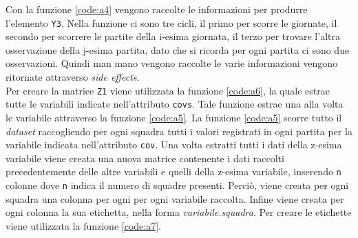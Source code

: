 Con la funzione \ref{code:a4} vengono raccolte le informazioni per produrre l'elemento \texttt{Y3}. Nella funzione ci sono tre cicli, il primo per scorre le giornate, il secondo per scorrere le partite della i-esima giornata, il terzo per trovare l'altra osservazione della j-esima partita, dato che si ricorda per ogni partita ci sono due osservazioni. Quindi man mano vengono raccolte le varie informazioni vengono ritornate attraverso \emph{side effects}.\\
Per creare la matrice \texttt{Z1} viene utilizzata la funzione \ref{code:a6}, la quale estrae tutte le variabili indicate nell'attributo \texttt{covs}. Tale funzione estrae una alla volta le variabile attraverso la funzione \ref{code:a5}. La funzione \ref{code:a5} scorre tutto il \emph{dataset} raccogliendo per ogni squadra tutti i valori registrati in ogni partita per la variabile indicata nell'attributo \texttt{cov}. Una volta estratti tutti i dati della z-esima variabile viene creata una nuova matrice contenente i dati raccolti precedentemente delle altre variabili e quelli della z-esima variabile, inserendo \texttt{n} colonne dove \texttt{n} indica il numero di squadre presenti. Perciò, viene creata per ogni squadra una colonna per ogni per ogni variabile raccolta. Infine viene creata per ogni colonna la sua etichetta, nella forma \emph{variabile.squadra}. Per creare le etichette viene utilizzata la funzione \ref{code:a7}.\\
\begin{comment}
Infine, vengono riportati i comandi per eseguire le modifiche
\begin{lstlisting}[language=R, caption={Comandi per la creazione della lista per il pacchetto \textit{BTLLAsso}}, captionpos=b, label=sec:a9]
	Ztmp <-c()
	row <- rowLabel(str1, 38)
	createYFull(SerieA)
	subject.name <- levels(as.factor(SerieA$Round))
	object.name <- levels(as.factor(SerieA$Team))
	Ztmp<-extractAll(c("Poss","Sh","SoT", "G/Sh", "Saves", "PAtt","PCmp%", "SPAtt",    "SPCmp%",  
	"MPAtt",    "MPCmp%",   "LPAtt",    "LPCmp%", "ToDefPen", "ToDef3rd", "ToMid3rd", "ToAtt3rd", "ToAttPen", "TotDist", "Fls", "Fld", "Off", "Crs", "Int", "TklWin", "Recov"), row, object.name)
	SerieA2122 <- list(Y3 = list(response = as.ordered(response), first.object = as.double(first.object), second.object = as.double(second.object), subject = subject, withS = TRUE, subject.names = subject.name, object.names = object.name, n = 38, m = 20, k = 3, q = 2, with.order = with.order), Z1 = Ztmp)
\end{lstlisting}
\end{comment}

